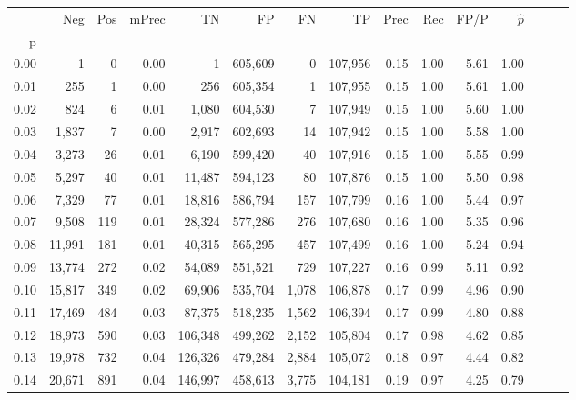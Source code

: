 \begin{tabular}{rrrrrrrrrrrrrrr}
\toprule
{} &     Neg &    Pos & mPrec &       TN &       FP &       FN &       TP &  Prec &   Rec &  FP/P & $\hat{p}$ \\
p    &         &        &       &          &          &          &          &       &       &       &           \\
\midrule
0.00 &       1 &      0 &  0.00 &        1 &  605,609 &        0 &  107,956 &  0.15 &  1.00 &  5.61 &      1.00 \\
0.01 &     255 &      1 &  0.00 &      256 &  605,354 &        1 &  107,955 &  0.15 &  1.00 &  5.61 &      1.00 \\
0.02 &     824 &      6 &  0.01 &    1,080 &  604,530 &        7 &  107,949 &  0.15 &  1.00 &  5.60 &      1.00 \\
0.03 &   1,837 &      7 &  0.00 &    2,917 &  602,693 &       14 &  107,942 &  0.15 &  1.00 &  5.58 &      1.00 \\
0.04 &   3,273 &     26 &  0.01 &    6,190 &  599,420 &       40 &  107,916 &  0.15 &  1.00 &  5.55 &      0.99 \\
0.05 &   5,297 &     40 &  0.01 &   11,487 &  594,123 &       80 &  107,876 &  0.15 &  1.00 &  5.50 &      0.98 \\
0.06 &   7,329 &     77 &  0.01 &   18,816 &  586,794 &      157 &  107,799 &  0.16 &  1.00 &  5.44 &      0.97 \\
0.07 &   9,508 &    119 &  0.01 &   28,324 &  577,286 &      276 &  107,680 &  0.16 &  1.00 &  5.35 &      0.96 \\
0.08 &  11,991 &    181 &  0.01 &   40,315 &  565,295 &      457 &  107,499 &  0.16 &  1.00 &  5.24 &      0.94 \\
0.09 &  13,774 &    272 &  0.02 &   54,089 &  551,521 &      729 &  107,227 &  0.16 &  0.99 &  5.11 &      0.92 \\
0.10 &  15,817 &    349 &  0.02 &   69,906 &  535,704 &    1,078 &  106,878 &  0.17 &  0.99 &  4.96 &      0.90 \\
0.11 &  17,469 &    484 &  0.03 &   87,375 &  518,235 &    1,562 &  106,394 &  0.17 &  0.99 &  4.80 &      0.88 \\
0.12 &  18,973 &    590 &  0.03 &  106,348 &  499,262 &    2,152 &  105,804 &  0.17 &  0.98 &  4.62 &      0.85 \\
0.13 &  19,978 &    732 &  0.04 &  126,326 &  479,284 &    2,884 &  105,072 &  0.18 &  0.97 &  4.44 &      0.82 \\
0.14 &  20,671 &    891 &  0.04 &  146,997 &  458,613 &    3,775 &  104,181 &  0.19 &  0.97 &  4.25 &      0.79 \\

\end{tabular}
